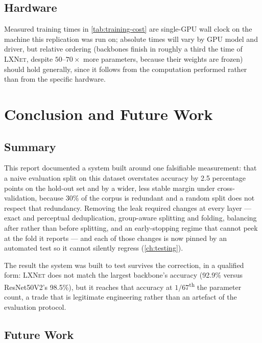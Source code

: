 \documentclass[11pt,a4paper,oneside]{report}
\newcommand{\LXNet}{\textsc{LXNet}}
\begin{document}
\section{Hardware}

Measured training times in \cref{tab:training-cost} are single-GPU wall
clock on the machine this replication was run on; absolute times will vary
by GPU model and driver, but relative ordering (backbones finish in roughly a
third the time of \LXNet{}, despite $50$--$70\times$ more parameters, because
their weights are frozen) should hold generally, since it follows from the
computation performed rather than from the specific hardware.

\chapter{Conclusion and Future Work}
\label{ch:conclusion}

\section{Summary}

This report documented a system built around one falsifiable measurement:
that a naive evaluation split on this dataset overstates accuracy by 2.5
percentage points on the hold-out set and by a wider, less stable margin
under cross-validation, because 30\% of the corpus is redundant and a random
split does not respect that redundancy. Removing the leak required changes
at every layer --- exact and perceptual deduplication, group-aware splitting
and folding, balancing after rather than before splitting, and an
early-stopping regime that cannot peek at the fold it reports --- and each of
those changes is now pinned by an automated test so it cannot silently
regress (\cref{ch:testing}).

The result the system was built to test survives the correction, in a
qualified form: \LXNet{} does not match the largest backbone's accuracy
(92.9\% versus ResNet50V2's 98.5\%), but it reaches that accuracy at
$1/67$\textsuperscript{th} the parameter count, a trade that is legitimate
engineering rather than an artefact of the evaluation protocol.

\section{Future Work}
\end{document}
